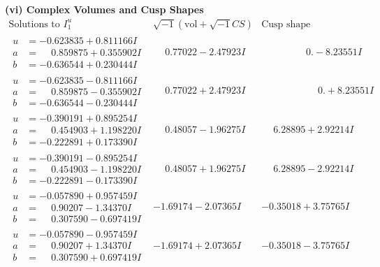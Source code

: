\documentclass[1p]{elsarticle_modified}
\theoremstyle{definition}
\newcommand{\I}{\sqrt{-1}}
\begin{document}
\newpage\flushleft \textbf{(vi) Complex Volumes and Cusp Shapes}
$$\begin{array}{c|c|c}  
\text{Solutions to }I^u_{1}& \I (\text{vol} + \sqrt{-1}CS) & \text{Cusp shape}\\
 \hline 
\begin{aligned}
u &= -0.623835 + 0.811166 I \\
a &= \phantom{-}0.859875 + 0.355902 I \\
b &= -0.636544 + 0.230444 I\end{aligned}
 & \phantom{-}0.77022 - 2.47923 I & \phantom{-0.000000 } 0. - 8.23551 I \\ \hline\begin{aligned}
u &= -0.623835 - 0.811166 I \\
a &= \phantom{-}0.859875 - 0.355902 I \\
b &= -0.636544 - 0.230444 I\end{aligned}
 & \phantom{-}0.77022 + 2.47923 I & \phantom{-0.000000 -}0. + 8.23551 I \\ \hline\begin{aligned}
u &= -0.390191 + 0.895254 I \\
a &= \phantom{-}0.454903 + 1.198220 I \\
b &= -0.222891 + 0.173390 I\end{aligned}
 & \phantom{-}0.48057 - 1.96275 I & \phantom{-}6.28895 + 2.92214 I \\ \hline\begin{aligned}
u &= -0.390191 - 0.895254 I \\
a &= \phantom{-}0.454903 - 1.198220 I \\
b &= -0.222891 - 0.173390 I\end{aligned}
 & \phantom{-}0.48057 + 1.96275 I & \phantom{-}6.28895 - 2.92214 I \\ \hline\begin{aligned}
u &= -0.057890 + 0.957459 I \\
a &= \phantom{-}0.90207 - 1.34370 I \\
b &= \phantom{-}0.307590 - 0.697419 I\end{aligned}
 & -1.69174 - 2.07365 I & -0.35018 + 3.75765 I \\ \hline\begin{aligned}
u &= -0.057890 - 0.957459 I \\
a &= \phantom{-}0.90207 + 1.34370 I \\
b &= \phantom{-}0.307590 + 0.697419 I\end{aligned}
 & -1.69174 + 2.07365 I & -0.35018 - 3.75765 I \\ \hline\begin{aligned}

\end{aligned}
\end{array}$$
\end{document}
